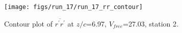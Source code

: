 \begin{figure}[H]
\centering
\texttt{[image: figs/run\_17/run\_17\_rr\_contour]}
\caption{Contour plot of $\overline{r^\prime r^\prime}$ at $z/c$=6.97, $V_{free}$=27.03, station 2.}
\label{fig:run_17_rr_contour}
\end{figure}


